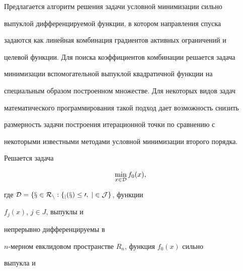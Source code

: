 \pagestyle{plain} %













\maketitle










Предлагается алгоритм решения задачи условной минимизации сильно


выпуклой дифференцируемой функции, в котором направления спуска


задаются как линейная комбинация градиентов активных ограничений и


целевой функции. Для поиска коэффициентов комбинации решается задача


минимизации вспомогательной выпуклой квадратичной функции на


специальным образом построенном множестве. Для некоторых видов задач


математического программирования такой подход дает возможность снизить


размерность задачи построения итерационной точки по сравнению с


некоторыми известными методами условной минимизации второго порядка.





Решается задача


\begin{equation}


\min_{x\in\cal D}f_0(x),


\end{equation}


где $\cal D=\{x\in R_n:f_j(x)\le 0,\;j\in J\}$, функции


$f_j(x)$, $j\in J$, выпуклы и


непрерывно дифференцируемы в


$n$-мерном евклидовом пространстве $R_n$, функция $f_0(x)$ сильно


выпукла и


